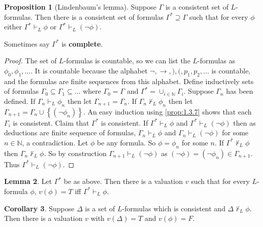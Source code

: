 \documentclass{article}
\newcommand{\N}{\mathbb{N}}
\newcommand{\rb}[1]{\left( #1 \right)}
\newcommand{\cb}[1]{\left\{ #1 \right\}}
\newcommand{\notb}[1]{\rb{\neg #1}}
\theoremstyle{definition}\newtheorem{definition}{Definition}[subsection]
\theoremstyle{definition}\newtheorem{remark}[definition]{Remark}
\theoremstyle{definition}\newtheorem*{example}{Example}
\theoremstyle{definition}\newtheorem*{note}{Note}
\newtheorem{proposition}[definition]{Proposition}
\newtheorem{lemma}[definition]{Lemma}
\newtheorem{corollary}[definition]{Corollary}
\begin{document}
\begin{proposition}[Lindenbaum's lemma]
\label{prop:1.3.8}
Suppose $ \Gamma $ is a consistent set of $ L $-formulas. Then there is a consistent set of formulas $ \Gamma^* \supseteq \Gamma $ such that for every $ \phi $ either $ \Gamma^* \vdash_L \phi $ or $ \Gamma^* \vdash_L \notb{\phi} $.
\end{proposition}

Sometimes say $ \Gamma^* $ is \textbf{complete}.

\begin{proof}
The set of $ L $-formulas is countable, so we can list the $ L $-formulas as $ \phi_0, \phi_1, \dots $. It is countable because the alphabet $ \neg, \rightarrow, ), (, p_1, p_2, \dots $ is countable, and the formulas are finite sequences from this alphabet. Define inductively sets of formulas $ \Gamma_0 \subseteq \Gamma_1 \subseteq \dots $ where $ \Gamma_0 = \Gamma $ and $ \Gamma^* = \cup_{i \in \N} \Gamma_i $. Suppose $ \Gamma_n $ has been defined. If $ \Gamma_n \vdash_L \phi_n $ then let $ \Gamma_{n + 1} = \Gamma_n $. If $ \Gamma_n \not\vdash_L \phi_n $ then let $ \Gamma_{n + 1} = \Gamma_n \cup \cb{\notb{\phi_n}} $. An easy induction using \ref{prop:1.3.7} shows that each $ \Gamma_i $ is consistent. Claim that $ \Gamma^* $ is consistent. If $ \Gamma^* \vdash_L \phi $ and $ \Gamma^* \vdash_L \notb{\phi} $ then as deductions are finite sequence of formulas, $ \Gamma_n \vdash_L \phi $ and $ \Gamma_n \vdash_L \notb{\phi} $ for some $ n \in \N $, a contradiction. Let $ \phi $ be any formula. So $ \phi = \phi_n $ for some $ n $. If $ \Gamma^* \not\vdash_L \phi $ then $ \Gamma_n \not\vdash_L \phi $. So by construction $ \Gamma_{n + 1} \vdash_L \notb{\phi} $ as $ \notb{\phi} = \notb{\phi_n} \in \Gamma_{n + 1} $. Thus $ \Gamma^* \vdash_L \notb{\phi} $.
\end{proof}


\begin{lemma}
\label{lem:1.3.9}
Let $ \Gamma^* $ be as above. Then there is a valuation $ v $ such that for every $ L $-formula $ \phi $, $ v\rb{\phi} = T $ iff $ \Gamma^* \vdash_L \phi $.
\end{lemma}

\begin{corollary}
\label{cor:1.3.10}
Suppose $ \Delta $ is a set of $ L $-formulas which is consistent and $ \Delta \not\vdash_L \phi $. Then there is a valuation $ v $ with $ v\rb{\Delta} = T $ and $ v\rb{\phi} = F $.
\end{corollary}
\end{document}
